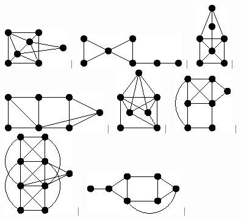 \documentclass[11pt,paper=b5,footinclude,headinclude]{scrbook} %
\newtheorem{ex}{Vaja\hypertarget{sol:\theex}}[chapter]
\begin{document}
\begin{ex}
\begin{figure}
\includegraphics[scale=0.5]{smallGraphs/g_co-X127.png}$\,\mid\,$\
\includegraphics[scale=0.5]{smallGraphs/g_co-X128.png}$\,\mid\,$\
\includegraphics[scale=0.5]{smallGraphs/g_co-X129.png}$\,\mid\,$\
\includegraphics[scale=0.5]{smallGraphs/g_co-X13.png}$\,\mid\,$\
\includegraphics[scale=0.5]{smallGraphs/g_co-X130.png}$\,\mid\,$\
\includegraphics[scale=0.5]{smallGraphs/g_co-X132.png}$\,\mid\,$\
\includegraphics[scale=0.5]{smallGraphs/g_co-X139.png}$\,\mid\,$\
\includegraphics[scale=0.5]{smallGraphs/g_co-X14.png}$\,\mid\,$\

\end{figure}
\end{ex}
\end{document}
